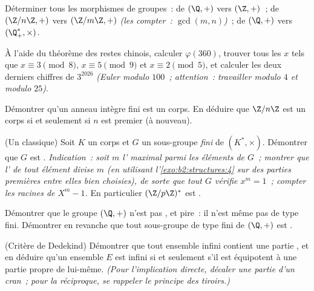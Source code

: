 \begin{exercise}[$\star\star$]\label{exo:b2:structures:7}
Déterminer tous les morphismes de groupes~: de $(\Q, +)$ vers
$(\Z, +)$~; de $(\Z/n\Z, +)$ vers $(\Z/m\Z, +)$ \emph{(les compter~:
$\gcd(m,n)$)}~; de $(\Q, +)$ vers $(\Q_+^*, \times)$.
\end{exercise}

\begin{exercise}[$\star\star$]\label{exo:b2:structures:8}
À l'aide du théorème des restes chinois, calculer $\varphi(360)$,
trouver tous les $x$ tels que $x \equiv 3 \pmod 8$, $x \equiv 5 \pmod
9$ et $x \equiv 2 \pmod 5$, et calculer les deux derniers chiffres de
$3^{2026}$ \emph{(Euler modulo $100$~; attention~: travailler modulo
$4$ et modulo $25$)}.
\end{exercise}

\begin{exercise}[$\star\star\star$]\label{exo:b2:structures:9}
Démontrer qu'un anneau intègre fini est un corps. En déduire que
$\Z/n\Z$ est un corps si et seulement si $n$ est premier (à nouveau).
\end{exercise}

\begin{exercise}[$\star\star\star$]\label{exo:b2:structures:10}
(Un classique) Soit $K$ un corps et $G$ un sous-groupe \emph{fini} de
$(K^*, \times)$. Démontrer que $G$ est .
\emph{Indication~: soit $m$ l' maximal parmi les éléments de
$G$~; montrer que l' de tout élément divise $m$ (en utilisant
l'\cref{exo:b2:structures:4} sur des parties premières entre elles
bien choisies), de sorte que tout $G$ vérifie $x^m = 1$~; compter les
racines de $X^m - 1$.}
En particulier $(\Z/p\Z)^*$ est .
\end{exercise}

\begin{exercise}[$\star\star\star$]\label{exo:b2:structures:11}
Démontrer que le groupe $(\Q, +)$ n'est pas , et pire~: il
n'est même pas de type fini. Démontrer en revanche que tout
sous-groupe de type fini de $(\Q, +)$ est .
\end{exercise}

\begin{exercise}[$\star\star$]\label{exo:b2:structures:12}
(Critère de Dedekind) Démontrer que tout ensemble infini contient une
partie , et en déduire qu'un ensemble $E$ est infini si et
seulement s'il est équipotent à une partie propre de lui-même.
\emph{(Pour l'implication directe, décaler une partie  d'un
cran~; pour la réciproque, se rappeler le principe des tiroirs.)}
\end{exercise}

